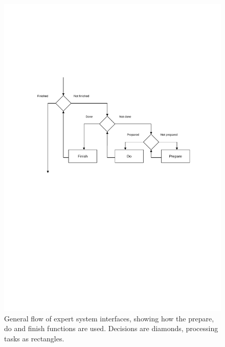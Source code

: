 \documentclass[preprint,pdf]{iucr}
\begin{document}
\begin{figure}
\caption{General flow of expert system interfaces, showing how the
  prepare, do and finish functions are used. Decisions are diamonds,
  processing tasks as rectangles.
\label{figure:fig6}}
\centering
\includegraphics[scale=0.5]{figures/Fig6.pdf}
\end{figure}







{}

%
\end{document}
